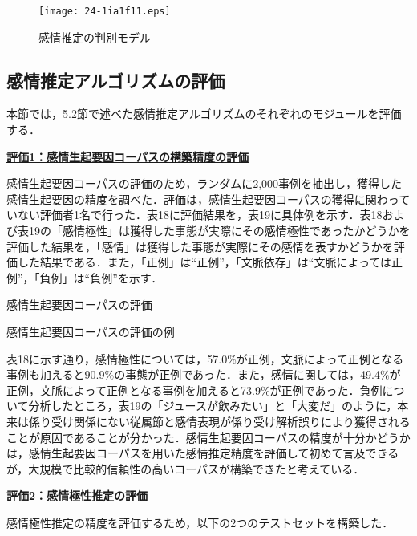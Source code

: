 \documentclass[japanese]{jnlp_1.4}
\begin{document}
\begin{figure}[t]
\begin{center}
\texttt{[image: 24-1ia1f11.eps]}
\end{center}
\caption{感情推定の判別モデル}
\label{fig:11}
\end{figure}


\subsection{感情推定アルゴリズムの評価}

本節では，5.2節で述べた感情推定アルゴリズムのそれぞれのモジュールを評価する．


\noindent\textbf{\underline{評価1：感情生起要因コーパスの構築精度の評価}}

感情生起要因コーパスの評価のため，ランダムに2,000事例を抽出し，獲得した感情生起要因の精度を調べた．評価は，感情生起要因コーパスの獲得に関わっていない評価者1名で行った．表18に評価結果を，表19に具体例を示す．表18および表19の「感情極性」は獲得した事態が実際にその感情極性であったかどうかを評価した結果を，「感情」は獲得した事態が実際にその感情を表すかどうかを評価した結果である．また，「正例」は“正例”，「文脈依存」は“文脈によっては正例”，「負例」は“負例”を示す．

\begin{table}[t]
\caption{感情生起要因コーパスの評価}
\label{table:18}

\end{table}
\begin{table}[t]
\caption{感情生起要因コーパスの評価の例}
\label{table:19}

\vspace{-0.5\Cvs}
\end{table}

表18に示す通り，感情極性については，57.0\%が正例，文脈によって正例となる事例も加えると90.9\%の事態が正例であった．また，感情に関しては，49.4\%が正例，文脈によって正例となる事例を加えると73.9\%が正例であった．負例について分析したところ，表19の「ジュースが飲みたい」と「大変だ」のように，本来は係り受け関係にない従属節と感情表現が係り受け解析誤りにより獲得されることが原因であることが分かった．感情生起要因コーパスの精度が十分かどうかは，感情生起要因コーパスを用いた感情推定精度を評価して初めて言及できるが，大規模で比較的信頼性の高いコーパスが構築できたと考えている．


\noindent\textbf{\underline{評価2：感情極性推定の評価}}

感情極性推定の精度を評価するため，以下の2つのテストセットを構築した．
\end{document}
